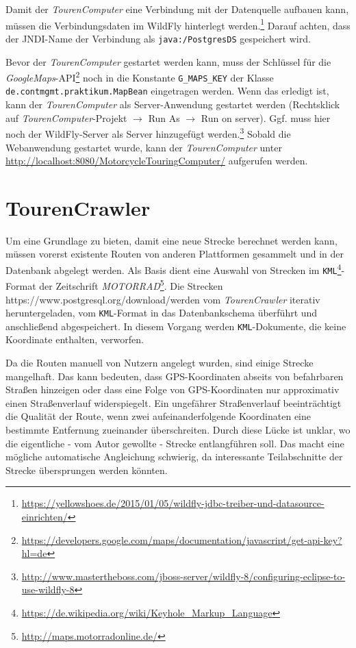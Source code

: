 \documentclass[a4paper,11pt,utf8]{scrartcl}
\begin{document}
Damit der \textit{TourenComputer} eine Verbindung mit der Datenquelle aufbauen kann, müssen die Verbindungsdaten im WildFly hinterlegt werden.\footnote{\url{https://yellowshoes.de/2015/01/05/wildfly-jdbc-treiber-und-datasource-einrichten/}} Darauf achten, dass der JNDI-Name der Verbindung als \texttt{java:/PostgresDS} gespeichert wird.

Bevor der \textit{TourenComputer} gestartet werden kann, muss der Schlüssel für die \textit{GoogleMaps}-API\footnote{\url{https://developers.google.com/maps/documentation/javascript/get-api-key?hl=de}} noch in die Konstante \texttt{G\_MAPS\_KEY} der Klasse \texttt{de.contmgmt.praktikum.MapBean} eingetragen werden. Wenn das erledigt ist, kann der \textit{TourenComputer} als Server-Anwendung gestartet werden (Rechtsklick auf \textit{TourenComputer}-Projekt $\rightarrow$ Run As $\rightarrow$ Run on server). Ggf. muss hier noch der WildFly-Server als Server hinzugefügt werden.\footnote{\url{http://www.mastertheboss.com/jboss-server/wildfly-8/configuring-eclipse-to-use-wildfly-8}} Sobald die Webanwendung gestartet wurde, kann der \textit{TourenComputer} unter \url{http://localhost:8080/MotorcycleTouringComputer/} aufgerufen werden.
 
\section{TourenCrawler}
Um eine Grundlage zu bieten, damit eine neue Strecke berechnet werden kann, müssen vorerst existente Routen von anderen Plattformen gesammelt und in der Datenbank abgelegt werden. Als Basis dient eine Auswahl von Strecken im \texttt{KML}\footnote{\url{https://de.wikipedia.org/wiki/Keyhole_Markup_Language}}-Format der Zeitschrift \textit{MOTORRAD}\footnote{\url{http://maps.motorradonline.de/}}. Die Strecken https://www.postgresql.org/download/werden vom \textit{TourenCrawler} iterativ heruntergeladen, vom \texttt{KML}-Format in das Datenbankschema überführt und anschließend abgespeichert. In diesem Vorgang werden \texttt{KML}-Dokumente, die keine Koordinate enthalten, verworfen.

Da die Routen manuell von Nutzern angelegt wurden, sind einige Strecke mangelhaft. Das kann bedeuten, dass GPS-Koordinaten abseits von befahrbaren Straßen hinzeigen oder dass eine Folge von GPS-Koordinaten nur approximativ einen Straßenverlauf widerspiegelt. Ein ungefährer Straßenverlauf beeinträchtigt die Qualität der Route, wenn zwei aufeinanderfolgende Koordinaten eine bestimmte Entfernung zueinander überschreiten. Durch diese \glqq Lücke\grqq{} ist unklar, wo die eigentliche - vom Autor gewollte - Strecke entlangführen soll. Das macht eine mögliche automatische Angleichung schwierig, da interessante Teilabschnitte der Strecke übersprungen werden könnten. 
\end{document}
